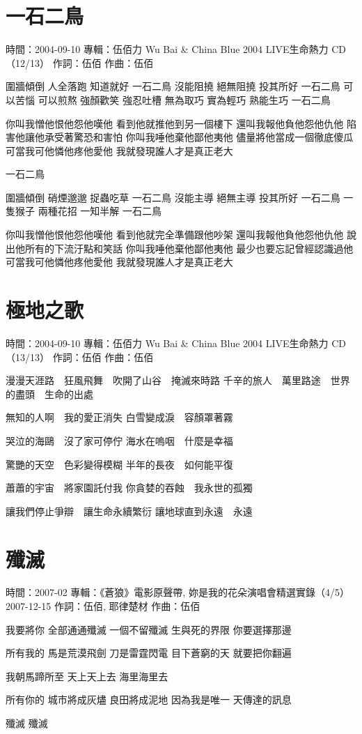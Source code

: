 \documentclass[UTF8,a4paper,oneside,twocolumn,12pt]{ctexbook}
\newcommand{\infopair}[2]{\textbullet #1：#2}
\newcommand{\zc}[1][伍佰]{\infopair{作詞}{#1}}
\newcommand{\zq}[1][伍佰]{\infopair{作曲}{#1}}
\newcommand{\zj}[1]{\infopair{專輯}{#1}}
\newcommand{\sj}[1]{\infopair{時間}{#1}}
\newenvironment{info}{\begin{flushleft}\kaishu
	}
	{\end{flushleft}\normalsize\yahei\par}
\newenvironment{lyric}{
	}
{}
\begin{document}
\section{一石二鳥}
\begin{info}
	\sj{2004-09-10}
	\zj{伍佰力 Wu Bai \& China Blue 2004 LIVE生命熱力 CD（12/13）}
	\zc
	\zq
\end{info}
\begin{lyric}
	圍牆傾倒 人全落跑
	知道就好 一石二鳥
	沒能阻撓 絕無阻撓
	投其所好 一石二鳥
	可以苦惱 可以煎熬
	強顏歡笑 強忍吐槽
	無為取巧 實為輕巧
	熟能生巧 一石二鳥

	你叫我憎他恨他怨他嘆他
	看到他就推他到另一個樓下
	還叫我報他負他怨他仇他
	陷害他讓他承受著驚恐和害怕
	你叫我唾他棄他鄙他夷他
	儘量將他當成一個徹底傻瓜
	可當我可他憐他疼他愛他
	我就發現誰人才是真正老大

	一石二鳥

	圍牆傾倒 硝煙邈邈
	捉蟲吃草 一石二鳥
	沒能主導 絕無主導
	投其所好 一石二鳥
	一隻猴子 兩種花招
	一知半解 一石二鳥

	你叫我憎他恨他怨他嘆他
	看到他就完全準備跟他吵架
	還叫我報他負他怨他仇他
	說出他所有的下流汙點和笑話
	你叫我唾他棄他鄙他夷他
	最少也要忘記曾經認識過他
	可當我可他憐他疼他愛他
	我就發現誰人才是真正老大
\end{lyric}

\section{極地之歌}
\begin{info}
	\sj{2004-09-10}
	\zj{伍佰力 Wu Bai \& China Blue 2004 LIVE生命熱力 CD（13/13）}
	\zc
	\zq
\end{info}
\begin{lyric}
	漫漫天涯路　狂風飛舞　吹開了山谷　掩滅來時路
	千辛的旅人　萬里路途　世界的盡頭　生命的出處

	無知的人啊　我的愛正消失
	白雪變成淚　容顏罩著霧

	哭泣的海鷗　沒了家可停佇
	海水在嗚咽　什麼是幸福

	驚艷的天空　色彩變得模糊
	半年的長夜　如何能平復

	蕭蕭的宇宙　將家園託付我
	你貪婪的吞蝕　我永世的孤獨

	讓我們停止爭辯　讓生命永續繁衍
	讓地球直到永遠　永遠
\end{lyric}

\section{殲滅}
\begin{info}
	\sj{2007-02}
	\zj{《蒼狼》電影原聲帶, 妳是我的花朵演唱會精選實錄（4/5） 2007-12-15}
	\zc[伍佰, 耶律楚材]
	\zq
\end{info}
\begin{lyric}
	我要將你
	全部通通殲滅
	一個不留殲滅
	生與死的界限
	你要選擇那邊

	所有我的
	馬是荒漠飛劍
	刀是雷霆閃電
	目下蒼窮的天
	就要把你翻遍

	我朝馬蹄所至 天上天上去 海里海里去

	所有你的
	城市將成灰燼
	良田將成泥地
	因為我是唯一
	天傳達的訊息

	殲滅 殲滅
\end{lyric}
\end{document}
